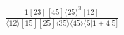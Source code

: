 \documentclass[varwidth, border=5pt]{standalone}
\begin{document}
\begin{my}
$\begin{gathered}
\scriptscriptstyle\frac{1[23][45]⟨25⟩^3[12]}{⟨12⟩[15][25]⟨35⟩⟨45⟩⟨5|1+4|5]}
\end{gathered}$
\end{my}
\end{document}
